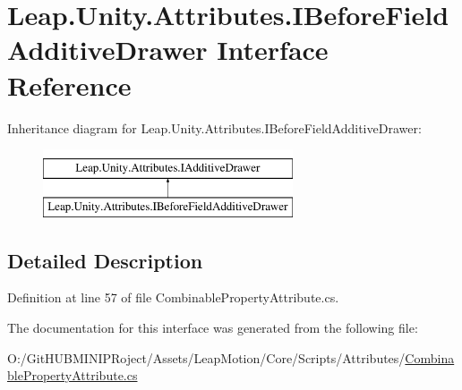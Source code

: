 \hypertarget{interface_leap_1_1_unity_1_1_attributes_1_1_i_before_field_additive_drawer}{}\section{Leap.\+Unity.\+Attributes.\+I\+Before\+Field\+Additive\+Drawer Interface Reference}
\label{interface_leap_1_1_unity_1_1_attributes_1_1_i_before_field_additive_drawer}
Inheritance diagram for Leap.\+Unity.\+Attributes.\+I\+Before\+Field\+Additive\+Drawer\+:\begin{figure}[H]
\begin{center}
\leavevmode
\includegraphics[height=2.000000cm]{interface_leap_1_1_unity_1_1_attributes_1_1_i_before_field_additive_drawer}
\end{center}
\end{figure}


\subsection{Detailed Description}


Definition at line 57 of file Combinable\+Property\+Attribute.\+cs.



The documentation for this interface was generated from the following file\+:\begin{DoxyCompactItemize}
\item 
O\+:/\+Git\+H\+U\+B\+M\+I\+N\+I\+P\+Roject/\+Assets/\+Leap\+Motion/\+Core/\+Scripts/\+Attributes/\mbox{\hyperlink{_combinable_property_attribute_8cs}{Combinable\+Property\+Attribute.\+cs}}\end{DoxyCompactItemize}

